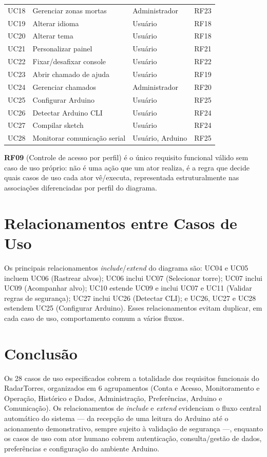 \begin{longtable}{p{1.0cm}p{6.6cm}p{3.3cm}p{2.3cm}}
  UC18 & Gerenciar zonas mortas & Administrador & RF23 \\
  UC19 & Alterar idioma & Usuário & RF18 \\
  UC20 & Alterar tema & Usuário & RF18 \\
  UC21 & Personalizar painel & Usuário & RF21 \\
  UC22 & Fixar/desafixar console & Usuário & RF22 \\
  UC23 & Abrir chamado de ajuda & Usuário & RF19 \\
  UC24 & Gerenciar chamados & Administrador & RF20 \\
  UC25 & Configurar Arduino & Usuário & RF25 \\
  UC26 & Detectar Arduino CLI & Usuário & RF24 \\
  UC27 & Compilar sketch & Usuário & RF24 \\
  UC28 & Monitorar comunicação serial & Usuário, Arduino & RF25 \\
\end{longtable}

\textbf{RF09} (Controle de acesso por perfil) é o único requisito funcional válido sem caso de uso
próprio: não é uma ação que um ator realiza, é a regra que decide quais casos de uso cada ator
vê/executa, representada estruturalmente nas associações diferenciadas por perfil do diagrama.

\section{Relacionamentos entre Casos de Uso}

Os principais relacionamentos \emph{include}/\emph{extend} do diagrama são: UC04 e UC05 incluem
UC06 (Rastrear alvos); UC06 inclui UC07 (Selecionar torre); UC07 inclui UC09 (Acompanhar alvo);
UC10 estende UC09 e inclui UC07 e UC11 (Validar regras de segurança); UC27 inclui UC26 (Detectar
CLI); e UC26, UC27 e UC28 estendem UC25 (Configurar Arduino). Esses relacionamentos evitam
duplicar, em cada caso de uso, comportamento comum a vários fluxos.

\section{Conclusão}

Os 28 casos de uso especificados cobrem a totalidade dos requisitos funcionais do RadarTorres,
organizados em 6 agrupamentos (Conta e Acesso, Monitoramento e Operação, Histórico e Dados,
Administração, Preferências, Arduino e Comunicação). Os relacionamentos de \emph{include} e
\emph{extend} evidenciam o fluxo central automático do sistema — da recepção de uma leitura do
Arduino até o acionamento demonstrativo, sempre sujeito à validação de segurança —, enquanto os
casos de uso com ator humano cobrem autenticação, consulta/gestão de dados, preferências e
configuração do ambiente Arduino.

